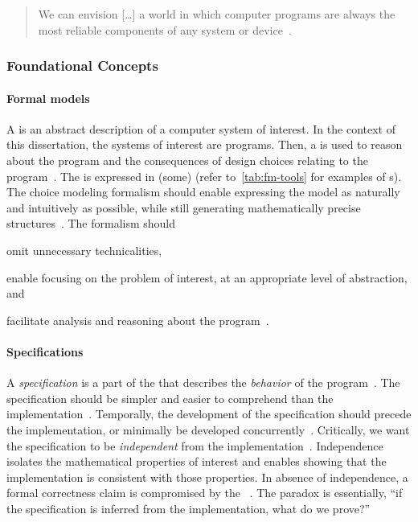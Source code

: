 \begin{quotation}
\noindent{}We can envision [\ldots] a world in which computer programs are
always the most reliable components of any system or device~\cite{hoare2021}.
\end{quotation}

\subsubsection{Foundational Concepts}
\label{subsubsec:verification-concepts}

\paragraph*{Formal models}
A  is an abstract description of a computer system of
interest. In the context of this dissertation, the systems of interest are
programs. Then, a  is used to reason about the program and the
consequences of design choices relating to the
program~\cite{zave2023,olveczky2017}. The  is expressed in
(some)  (refer to~\autoref{tab:fm-tools} for examples of
s). The choice modeling formalism should enable
expressing the model as naturally and intuitively as possible, while still
generating mathematically precise structures~\cite{olveczky2017,beek2024}. The
formalism should
\begin{enumerate*}[label=(\roman*)]
\item omit unnecessary technicalities,
\item enable focusing on the problem of interest, at an appropriate level of
abstraction, and
\item facilitate analysis and reasoning about the program~\cite{olveczky2017}.
\end{enumerate*}

\paragraph*{Specifications}
A \emph{specification} is a part of the  that describes the
\emph{behavior} of the program~\cite{zave2023b}. The specification should be
simpler and easier to comprehend than the implementation~\cite{zave2023b}.
Temporally, the development of the specification should precede the
implementation, or minimally be developed concurrently~\cite{dijkstra1972}.
Critically, we want the specification to be
\emph{independent} from the implementation~\cite{furia2014b}. Independence
isolates the mathematical properties of interest and enables showing that the
implementation is consistent with those properties. In absence of independence,
a formal correctness claim is compromised by the \emph{}~\cite{furia2014b}. The paradox is essentially, \enquote{if the
specification is inferred from the implementation, what do we prove?}

